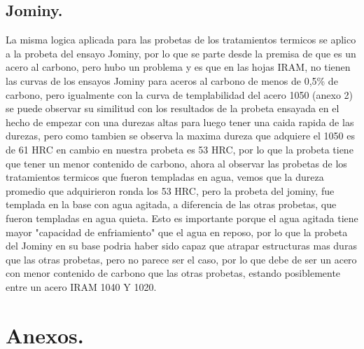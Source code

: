 \documentclass[12pt,a4paper]{article}
\begin{document}
\subsection{Jominy.}

La misma logica aplicada para las probetas de los tratamientos termicos se aplico a la probeta del ensayo Jominy, por lo que se parte desde la premisa de que es un acero al carbono, pero hubo un problema y es que en las hojas IRAM, no tienen las curvas de los ensayos Jominy para aceros al carbono de menos de 0,5\% de carbono, pero igualmente con la curva de templabilidad del acero 1050 (anexo 2) se puede observar su similitud con los resultados de la probeta ensayada en el hecho de empezar con una durezas altas para luego tener una caida rapida de las durezas, pero como tambien se observa la maxima dureza que adquiere el 1050 es de 61 HRC en cambio en nuestra probeta es 53 HRC, por lo que la probeta tiene que tener un menor contenido de carbono, ahora al observar las probetas de los tratamientos termicos que fueron templadas en agua, vemos que la dureza promedio que adquirieron ronda los 53 HRC, pero la probeta del jominy, fue templada en la base con agua agitada, a diferencia de las otras probetas, que fueron templadas en agua quieta. Esto es importante porque el agua agitada tiene mayor "capacidad de enfriamiento" que el agua en reposo, por lo que la probeta del Jominy en su base podria haber sido capaz que atrapar estructuras mas duras que las otras probetas, pero no parece ser el caso, por lo que debe de ser un acero con menor contenido de carbono que las otras probetas, estando posiblemente entre un acero IRAM 1040 Y 1020.

\section{Anexos.}


\end{document}
